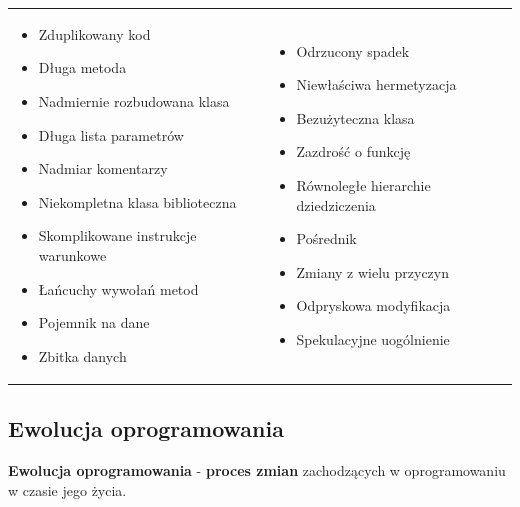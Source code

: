 \documentclass[a4paper]{article}
\begin{document}
    \begin{table}[H]
        \begin{center}
            \begin{tabular}{ p{} p{} }
                \begin{itemize}
                    \item Zduplikowany kod
                    \item Długa metoda
                    \item Nadmiernie rozbudowana klasa
                    \item Długa lista parametrów
                    \item Nadmiar komentarzy
                    \item Niekompletna klasa biblioteczna
                    \item Skomplikowane instrukcje warunkowe
                    \item Łańcuchy wywołań metod
                    \item Pojemnik na dane
                    \item Zbitka danych
                \end{itemize}
                &
                \begin{itemize}
                    \item Odrzucony spadek
                    \item Niewłaściwa hermetyzacja
                    \item Bezużyteczna klasa
                    \item Zazdrość o funkcję
                    \item Równoległe hierarchie dziedziczenia
                    \item Pośrednik
                    \item Zmiany z wielu przyczyn
                    \item Odpryskowa modyfikacja
                    \item Spekulacyjne uogólnienie
                \end{itemize}

            \end{tabular}
        \end{center}
    \end{table}
    \subsection{Ewolucja oprogramowania}
    \textbf{Ewolucja oprogramowania} - \textbf{proces zmian} zachodzących w oprogramowaniu
    w czasie jego życia.
\end{document}
